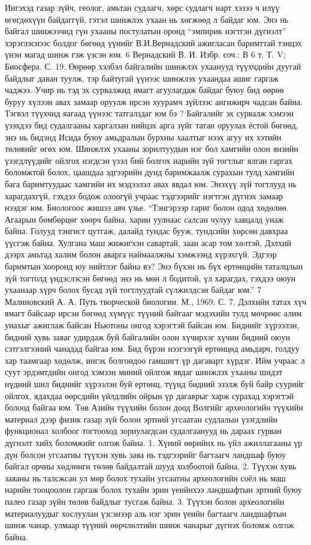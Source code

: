 Ингэхэд газар зүйч, геолог, амьтан судлагч, хөрс судлагч нарт хэзээ ч илүү өгөгдөхүүн байдаггүй, гэтэл шинжлэх ухаан нь хөгжөөд л байдаг юм. Энэ нь байгал шинжээчид гүн ухааны постулатын оронд “эмпирик нэгтгэн дүгнэлт” хэрэглэснээс болдог бөгөөд үүнийг В.И.Вернадский ажигласан баримттай тэнцэх үнэн магад шинж гэж үзсэн юм.
6 Вернадский В. И. Избр. соч.: В 6 т. Т. V; Биосфера. С. 19.
Өөрөөр хэлбэл байгалийн шинжлэх ухаанууд түүхчдийн дуугай байдлыг даван туулж, тэр байтугай үүнээс шинжлэх ухаандаа ашиг гаргаж чаджээ. Учир нь тэд эх сурвалжид ямагт агуулагдаж байдаг буюу бид өөрөө буруу хүлээн авах замаар оруулж ирсэн хуурамч зүйлээс ангижирч чадсан байна. Тэгвэл түүхчид яагаад үүнээс татгалздаг юм бэ ? Байгалийг эх сурвалж хэмээн үзэхдээ бид судалгааны харгалзан нийцэх арга зүйг татан оруулах ёстой бөгөөд, энэ нь бидэнд Исида буюу амьдралын бурхны хаалтыг нээх агуу их хэтийн төлөвийг өгөх юм.
Шинжлэх ухааны зорилтуудын нэг бол хамгийн олон янзийн үзэгдлүүдийг ойлгох нэгдсэн үзэл бий болгох нарийн зүй тогтлыг ялган гаргах боломжтой болох, цаашдаа эдгээрийн дунд баримжаалж сурахын тулд хамгийн бага баримтуудаас хамгийн их мэдээлэл авах явдал юм. Энэхүү зүй тогтлууд нь харагдахгүй, гэхдээ бодож олоогүй учраас тэдгээрийг нэгтгэн дүгнэх замаар нээдэг юм. Биологоос жишээ авч үзье. “Тэнгэрээр гариг болон одод хөдөлнө. Агаарын бөмбөрцөг хөөрч байна, харин уулнаас салсан чулуу хавцалд унаж байна. Голууд тэнгист цутгаж, далайд тундас бууж, тундсийн хөрсөн давхраа үүсгэж байна. Хулгана маш жижигхэн савартай, заан асар том хөлтэй, Дэлхий дээрх амьтад халим болон аварга наймаалжны хэмжээнд хүрэхгүй. Эдгээр баримтын хооронд юу нийтлэг байна вэ? Энэ бүхэн нь бүх ертөнцийн таталцлын зүй тогтолд үндэслэсэн бөгөөд энэ нь мөн л бодитой, үл харагдах, гэхдээ оюун ухаанаар хүрч болох бусад зүй тогтлуудтай сүлжилдсэн байдаг юм.”
7 Малиновский А. А. Путь творческой биологии. М., 1969. С. 7.
Дэлхийн татах хүч ямагт байсаар ирсэн бөгөөд хүмүүс түүний байгааг мэдэхийн тулд мөчрөөс алим унахыг ажиглаж байсан Ньютоны онгод хэрэгтэй байсан юм. Биднийг хүрээлэн, бидний хувь заяаг удирдаж буй байгалийн олон хүчирхэг хүчин бидний оюун сэтгэлгээний чанадад байгаа юм. Бид бүрэн нээгээгүй ертөнцөд амьдарч, голдуу хар таамгаар хөдөлж, ингэх болгондоо гамшигт үр дагаварт хүрдэг. Ийм учраас л суут эрдэмтдийн онгод хэмээн миний ойлгож явдаг шинжлэх ухааны шидэт нүдний шил биднийг хүрээлэн буй ертөнц, түүнд бидний эзэлж буй байр суурийг ойлгох, ядахдаа өөрсдийн үйлдлийн ойрын үр дагаврыг харж сурахад хэрэгтэй болоод байгаа юм.
Төв Азийн түүхийн болон доод Волгийг археологийн түүхийн материал дээр физик газар зүй болон эртний угсаатан судлалын үзэгдлийн функционал холбоог тогтооход зориулагдсан судалгаанууд нь дараах гурван дүгнэлт хийх боломжийг олгож байна. 1. Хүний өөрийнх нь үйл ажиллагааны үр дүн болсон угсаатны түүхэн хувь заяа нь тэдгээрийг багтаагч ландшаф буюу байгал орчны хөдлөнги төлөв байдалтай шууд холбоотой байна, 2. Түүхэн хувь заяаны нь талсжсан ул мөр болох тухайн угсаатны археологийн соёл нь маш нарийн тооцоолон гаргаж болох тухайн эрин үеийнхээ ландшафтын эртний буюу палео газар зүйн төлөв байдлыг тусгаж байна. 3. Түүхэн болон археологийн материалуудыг хослуулан үзсэнээр аль нэг эрин үеийн багтаагч ландшафтын шинж чанар, улмаар түүний өөрчлөлтийн шинж чанарыг дүгнэх боломж олгож байна.
